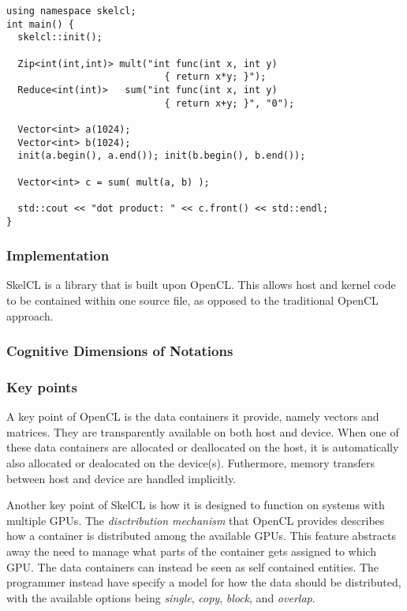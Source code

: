 \begin{lstlisting}[caption={Computation of the dot product of two vectors}, label=code:skelclSample] 
using namespace skelcl;
int main() {
  skelcl::init();

  Zip<int(int,int)> mult("int func(int x, int y)
                            { return x*y; }");
  Reduce<int(int)>   sum("int func(int x, int y)
                            { return x+y; }", "0");

  Vector<int> a(1024);
  Vector<int> b(1024);
  init(a.begin(), a.end()); init(b.begin(), b.end());

  Vector<int> c = sum( mult(a, b) );

  std::cout << "dot product: " << c.front() << std::endl;
}
\end{lstlisting}

\subsubsection{Implementation}
SkelCL is a library that is built upon OpenCL. This allows host and kernel code to be contained within one source file, as opposed to the traditional OpenCL approach.

\subsubsection{Cognitive Dimensions of Notations}

\subsubsection{Key points}
A key point of OpenCL is the data containers it provide, namely vectors and matrices. They are transparently available on both host and device. When one of these data containers are allocated or deallocated on the host, it is automatically also allocated or dealocated on the device(s). Futhermore, memory transfers between host and device are handled implicitly.

Another key point of SkelCL is how it is designed to function on systems with multiple GPUs. The \textit{disctribution mechanism} that OpenCL provides describes how a container is distributed among the available GPUs. This feature abstracts away the need to manage what parts of the container gets assigned to which GPU. The data containers can instead be seen as self contained entities. The programmer instead have specify a model for how the data should be distributed, with the available options being \textit{single}, \textit{copy}, \textit{block}, and \textit{overlap}.


